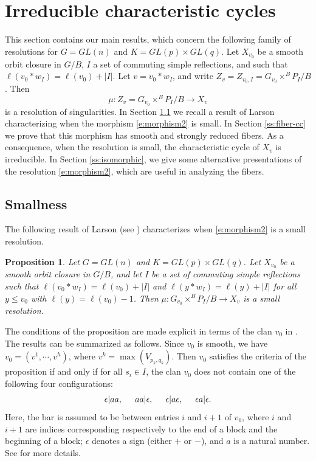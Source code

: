 \documentclass[11pt,letterpaper,reqno]{amsart}
\numberwithin{equation}{section}
\theoremstyle{plain}
\newtheorem{proposition}[theorem]{Proposition}
\theoremstyle{definition}
\theoremstyle{remark}
\begin{document}
\section{Irreducible characteristic cycles} \label{s:irreducible}
This section contains our main results, which concern the following family of resolutions for $G = GL(n)$ and $K = GL(p) \times GL(q)$.
Let $X_{v_0}$ be a smooth orbit closure in $G/B$, $I$ a set of commuting simple reflections, and
such that  $\ell(v_0* w_I) = \ell(v_0)+ |I|$.  Let $v = v_0 * w_I$, and write $Z_v = Z_{v_0, I} = G_{v_0} \times^B P_I/B$.
Then
\begin{equation} \label{e:morphism2}
\mu: Z_v = G_{v_0} \times^B P_I/B \to X_v
\end{equation}
is a resolution of singularities.  In Section \ref{ss:small} we recall a result of Larson characterizing when the morphism
\eqref{e:morphism2} is small.  In Section \ref{ss:fiber-cc} we prove that this morphism has smooth and strongly reduced fibers.
As a consequence, when the resolution is small, the characteristic cycle of $X_v$ is irreducible.  
In Section \ref{ss:isomorphic}, we give some alternative presentations of the resolution \eqref{e:morphism2}, which are
useful in analyzing the fibers.

\subsection{Smallness} \label{ss:small}
The following result of Larson (see \cite[Prop.~5.3.2]{Lar}) characterizes when \eqref{e:morphism2} is a small resolution.

\begin{proposition} \label{p:small}
Let $G = GL(n)$ and $K = GL(p) \times GL(q)$.  Let $X_{v_0}$ be a smooth orbit closure in $G/B$, and let $I$ be a set of commuting simple reflections such that  $\ell(v_0* w_I) = \ell(v_0)+ |I|$ and $\ell(y* w_I) = \ell(y) + |I|$ for all $y \leq v_0$ with $\ell(y) = \ell(v_0) - 1$.   Then $\mu: G_{v_0} \times^B P_I/B \to X_v$
is a small resolution.
\end{proposition}

The conditions of the proposition are made  explicit in terms of the clan $v_0$ in \cite[pp.~65-66]{Lar}.  The results can be summarized as follows.
Since $v_0$ is smooth, we have $v_0 = (v^1, \cdots, v^h)$, where $v^k = \max(V_{p_k,q_k})$.  Then $v_0$ satisfies the criteria of the proposition
if and only if for all $s_{i} \in I$, the clan $v_0$ does not contain one of the following four configurations:
\begin{equation} \label{e:badconfig}
\epsilon | a a, \hspace{.2in} a a | \epsilon,  \hspace{.2in} \epsilon | a \epsilon,  \hspace{.2in} \epsilon a | \epsilon.
\end{equation}
Here, the bar is assumed to be between entries $i$ and $i+1$ of $v_0$, where $i$ and $i+1$ are indices corresponding respectively
to the end of a block and the beginning of a block;
$\epsilon$ denotes a sign (either $+$ or $-$), and $a$ is a natural number.
See \cite[p.65, (5.10)]{Lar} for more details. 
\end{document}
